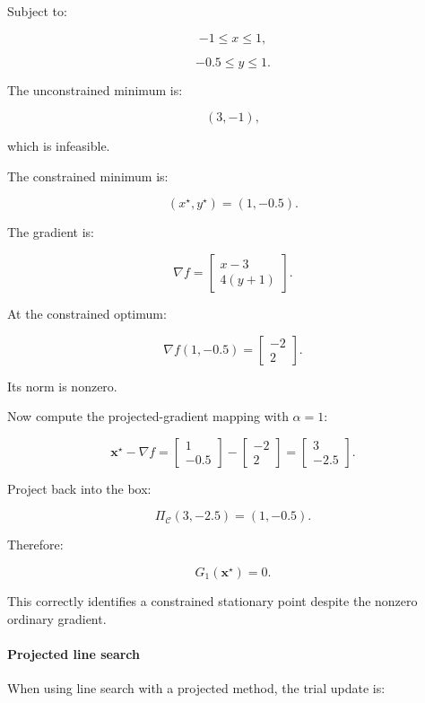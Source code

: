Subject to:

\[
-1\le x\le1,
\]

\[
-0.5\le y\le1.
\]

The unconstrained minimum is:

\[
(3,-1),
\]

which is infeasible.

The constrained minimum is:

\[
\boxed{ (x^\star,y^\star)=(1,-0.5) }.
\]

The gradient is:

\[
\nabla f= \begin{bmatrix} x-3\\ 4(y+1) \end{bmatrix}.
\]

At the constrained optimum:

\[
\nabla f(1,-0.5)= \begin{bmatrix} -2\\2 \end{bmatrix}.
\]

Its norm is nonzero.

Now compute the projected-gradient mapping with \(\alpha=1\):

\[
\mathbf x^\star-\nabla f= \begin{bmatrix} 1\\-0.5 \end{bmatrix} - \begin{bmatrix} -2\\2 \end{bmatrix} = \begin{bmatrix} 3\\-2.5 \end{bmatrix}.
\]

Project back into the box:

\[
\Pi_{\mathcal C}(3,-2.5)=(1,-0.5).
\]

Therefore:

\[
G_1(\mathbf x^\star)=0.
\]

This correctly identifies a constrained stationary point despite the nonzero ordinary gradient.

\paragraph{Projected line search}\label{02-foundations-ii-ch027-projected-line-search}

When using line search with a projected method, the trial update is:

